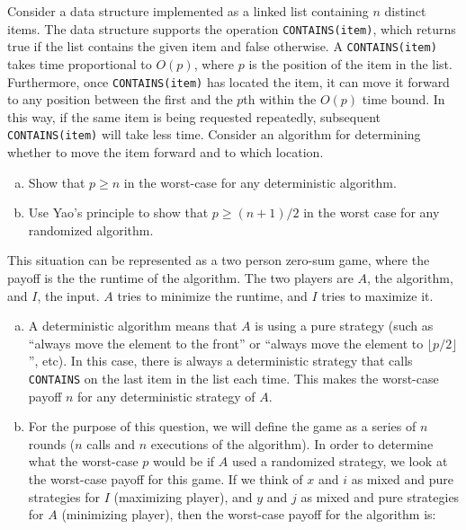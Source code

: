 \documentclass[fleqn]{homework}
\begin{document}
  \begin{problem}{3}
    \begin{question}
      Consider a data structure implemented as a linked list containing $n$
      distinct items.  The data structure supports the operation
      \texttt{CONTAINS(item)}, which returns true if the list contains the given
      item and false otherwise.  A \texttt{CONTAINS(item)} takes time
      proportional to $O(p)$, where $p$ is the position of the item in the
      list.  Furthermore, once \texttt{CONTAINS(item)} has located the item, it
      can move it forward to any position between the first and the $p$th within
      the $O(p)$ time bound.  In this way, if the same item is being requested
      repeatedly, subsequent \texttt{CONTAINS(item)} will take less time.
      Consider an algorithm for determining whether to move the item forward and
      to which location.

      \begin{enumerate}[a.]
      \item Show that $p \ge n$ in the worst-case for any deterministic
        algorithm.
      \item Use Yao's principle to show that $p \ge (n+1) / 2$ in the worst case
        for any randomized algorithm.
      \end{enumerate}
    \end{question}

    This situation can be represented as a two person zero-sum game, where the
    payoff is the the runtime of the algorithm.  The two players are $A$, the
    algorithm, and $I$, the input.  $A$ tries to minimize the runtime, and $I$
    tries to maximize it.

    \begin{enumerate}[a.]
    \item A deterministic algorithm means that $A$ is using a pure strategy
      (such as ``always move the element to the front'' or ``always move the
      element to $\lfloor p/2 \rfloor$'', etc).  In this case, there is always a
      deterministic strategy that calls \texttt{CONTAINS} on the last item in
      the list each time.  This makes the worst-case payoff $n$ for any
      deterministic strategy of $A$.
    \item For the purpose of this question, we will define the game as a series
      of $n$ rounds ($n$ calls and $n$ executions of the algorithm).  In order
      to determine what the worst-case $p$ would be if $A$ used a randomized
      strategy, we look at the worst-case payoff for this game.  If we think of
      $x$ and $i$ as mixed and pure strategies for $I$ (maximizing player), and
      $y$ and $j$ as mixed and pure strategies for $A$ (minimizing player), then
      the worst-case payoff for the algorithm is:


\end{enumerate}
\end{problem}
\end{document}
